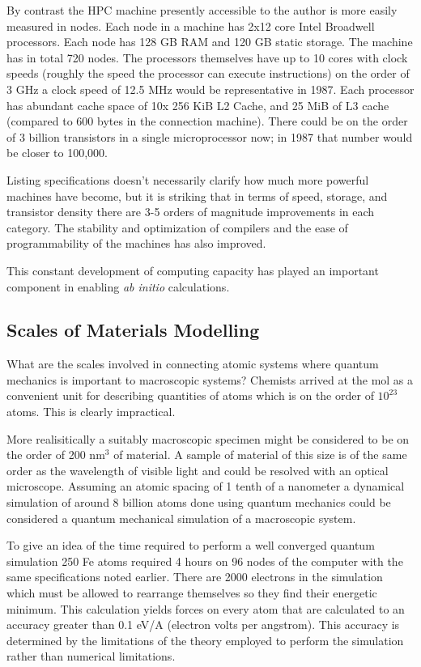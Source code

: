 By contrast the HPC machine presently accessible to the author 
is more easily measured in nodes. Each node in a machine has 2x12 core Intel Broadwell processors.
Each node has 128 GB RAM and 120 GB static storage. The machine has in total 720 nodes. 
The processors themselves have up to 10 cores with clock speeds (roughly the speed the
processor can execute instructions) on the order of 3 GHz a clock speed of 12.5 MHz would be representative in 1987. 
Each processor has abundant cache space of 10x 256 KiB L2 Cache, and 25 MiB of L3 cache 
(compared to 600 bytes in the connection machine). 
There could be on the order of 3 billion transistors in a single microprocessor now;
in 1987 that number would be closer to 100,000. 

Listing specifications doesn't necessarily clarify how much more powerful machines have become, 
but it is striking that in terms of speed, storage, and transistor density there are 3-5 orders of magnitude 
improvements in each category. The stability and optimization of compilers and the ease of programmability
of the machines has also improved.

This constant development of computing capacity has played an important component in enabling
{\it ab initio} calculations. 

\subsection{Scales of Materials Modelling}
What are the scales involved in connecting atomic systems where quantum mechanics is important
to macroscopic systems? Chemists arrived at the mol as a convenient unit for describing
quantities of atoms which is on the order of $10^{23}$ atoms. This is clearly impractical.

More realisitically a suitably macroscopic specimen might be considered to be on the 
order of 200 nm$^{3}$ of material. A sample of material of this size is of the 
same order as the wavelength of visible light and could be
resolved with an optical microscope. Assuming an atomic spacing of 1 tenth of a nanometer 
a dynamical simulation of around 8 billion atoms done using quantum mechanics 
could be considered a quantum mechanical simulation of a macroscopic system. 

To give an idea of the time required to perform a well converged quantum simulation 
250 Fe atoms required 4 hours on 96 nodes of the computer with the same 
specifications noted earlier. There are 2000 electrons in the simulation which must be allowed
to rearrange themselves so they find their energetic minimum. This calculation yields forces on every 
atom that are calculated to an accuracy greater than 0.1 eV/A (electron volts per angstrom).
This accuracy is determined by the limitations of the theory employed to perform the simulation
rather than numerical limitations.


